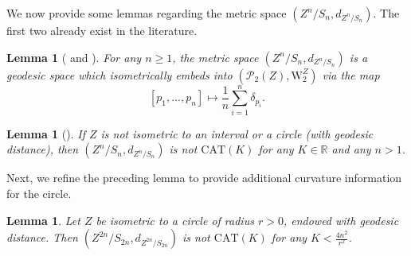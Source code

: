 \documentclass{article}
\newtheorem{lemma}[proposition]{Lemma}
\theoremstyle{definition}
\newcommand{\R}{\mathbb{R}}
\newcommand{\WZp}[1]{\mathcal{P}_{#1}(Z)}
\newcommand{\wzp}[1]{\mathrm{W}_{#1}^Z}
\begin{document}
We now provide some lemmas regarding the metric space $(Z^n/S_n,d_{Z^n/S_n})$. The first two already exist in the literature.

\begin{lemma}[{\cite[Proposition~20]{needham2023geometric}
    and \cite[Lemma~4.7]{harms2023geometry}}]\label{lem:embedding_symmetric_product}
    For any $n \geq 1$, the metric space $(Z^n/S_n,  d_{Z^n/S_n})$ is a geodesic space which isometrically embeds into $(\WZp{2},\wzp{2})$ via the map
    \[
    [p_1,\ldots, p_n] \mapsto \frac{1}{n} \sum_{i=1}^n \delta_{p_i}.
    \]
\end{lemma}

\begin{lemma}[{\cite[Theorem 22]{needham2023geometric}}]\label{lem:not_isometric_to_interval}
    If $Z$ is not isometric to an interval or a circle (with geodesic distance), then $(Z^n/S_n,d_{Z^n/S_n})$ is not $\mathrm{CAT}(K)$ for any $K \in \R$ and any $n > 1$. 
\end{lemma}

Next, we refine the preceding lemma to provide additional curvature information for the circle.

\begin{lemma}\label{lem:symmetric_product_circle}
    Let $Z$ be isometric to a circle of radius $r > 0$, endowed with geodesic distance. Then $(Z^{2n}/S_{2n},d_{Z^{2n}/S_{2n}})$ is not $\mathrm{CAT}(K)$ for any $K < \frac{4n^2}{r^2}$. 
\end{lemma}
\end{document}
